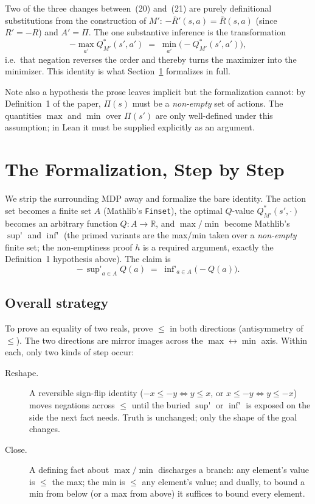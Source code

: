 \documentclass[11pt]{article}
\newcommand{\code}[1]{\texttt{#1}}
\newcommand{\R}{\mathbb{R}}
\DeclareMathOperator*{\supp}{sup'}
\DeclareMathOperator*{\infp}{inf'}
\begin{document}
Two of the three changes between~(20) and~(21) are purely definitional
substitutions from the construction of $M'$: $-\bar R'(s,a) = \bar R(s,a)$
(since $R' = -R$) and $A' = \Pi$. The one substantive inference is the
transformation
\[
  -\max_{a'} Q^{*}_{M'}(s',a')
  \;=\;
  \min_{a'}\bigl(-Q^{*}_{M'}(s',a')\bigr),
\]
i.e.\ that negation reverses the order and thereby turns the maximizer into the
minimizer. This identity is what Section~\ref{sec:lean} formalizes in full.

Note also a hypothesis the prose leaves implicit but the formalization cannot:
by Definition~1 of the paper, $\Pi(s)$ must be a \emph{non-empty} set of actions.
The quantities $\max$ and $\min$ over $\Pi(s')$ are only well-defined under this
assumption; in Lean it must be supplied explicitly as an argument.

\section{The Formalization, Step by Step}
\label{sec:lean}

We strip the surrounding MDP away and formalize the bare identity. The action
set becomes a finite set $A$ (Mathlib's \code{Finset}), the optimal $Q$-value
$Q^{*}_{M'}(s',\cdot)$ becomes an arbitrary function $Q : A \to \R$, and
$\max/\min$ become Mathlib's $\supp$ and $\infp$ (the primed variants are the
max/min taken over a \emph{non-empty} finite set; the non-emptiness proof
$h$ is a required argument, exactly the Definition~1 hypothesis above). The
claim is
\begin{equation}
  -\,\supp_{a \in A} Q(a) \;=\; \infp_{a \in A}\bigl(-Q(a)\bigr).
  \tag{$\star$}\label{eq:star}
\end{equation}

\subsection*{Overall strategy}

To prove an equality of two reals, prove $\le$ in both directions
(antisymmetry of $\le$). The two directions are mirror images across the
$\max \leftrightarrow \min$ axis. Within each, only two kinds of step occur:
\begin{description}
  \item[Reshape.] A reversible sign-flip identity
    ($-x \le -y \iff y \le x$, or $x \le -y \iff y \le -x$) moves negations
    across $\le$ until the buried $\supp$ or $\infp$ is exposed on the side the
    next fact needs. Truth is unchanged; only the shape of the goal changes.
  \item[Close.] A defining fact about $\max/\min$ discharges a branch: any
    element's value is $\le$ the max; the min is $\le$ any element's value; and
    dually, to bound a min from below (or a max from above) it suffices to bound
    every element.
\end{description}
\end{document}
